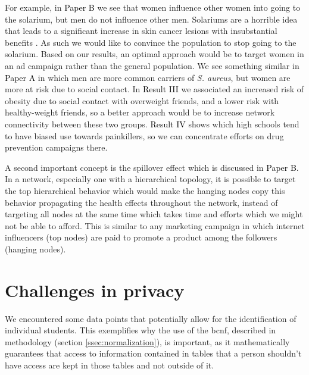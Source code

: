 

For example, in \colorbox{PaperColor}{\textcolor{black}{Paper B}} we see that women influence other women into going to the solarium, but men do not influence other men. Solariums are a horrible idea that leads to a significant increase in skin cancer lesions with insubstantial benefits \cite{deGruijl2017}. As such we would like to convince the population to stop going to the solarium. Based on our results, an optimal approach would be to target women in an ad campaign rather than the general population. We see something similar in \colorbox{PaperColor}{\textcolor{black}{Paper A}} in which men are more common carriers of \textit{S. aureus}, but women are more at risk due to social contact. In \colorbox{ResultColor}{\textcolor{black}{Result III}} we associated an increased risk of obesity due to social contact with overweight friends, and a lower risk with healthy-weight friends, so a better approach would be to increase network connectivity between these two groups. \colorbox{ResultColor}{\textcolor{black}{Result IV}} shows which high schools tend to have biased use towards painkillers, so we can concentrate efforts on drug prevention campaigns there.

A second important concept is the spillover effect \cite{Egami2020, Steptoe2008, Yan2015, Fletcher2018} which is discussed in \colorbox{PaperColor}{\textcolor{black}{Paper B}}. In a network, especially one with a hierarchical topology, it is possible to target the top hierarchical behavior which would make the hanging nodes copy this behavior propagating the health effects throughout the network, instead of targeting all nodes at the same time which takes time and efforts which we might not be able to afford. This is similar to any marketing campaign in which internet influencers (top nodes) are paid to promote a product among the followers (hanging nodes).


\section{Challenges in privacy}

We encountered some data points that potentially allow for the identification of individual students. This exemplifies why the use of the \gls{bcnf}, described in methodology (section \ref{ssec:normalization}), is important, as it mathematically guarantees that access to information contained in tables that a person shouldn't have access are kept in those tables and not outside of it.

